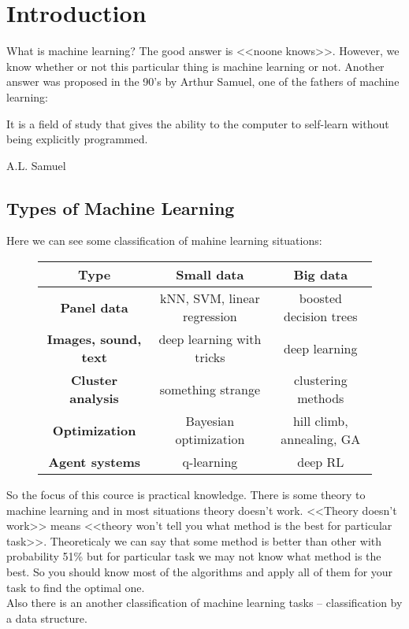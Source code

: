 \chapter{Introduction}

{\sf What is machine learning? The good answer is <<noone knows>>. However, we know whether or not this particular thing is machine learning or not. Another answer was proposed in the 90's by Arthur Samuel, one of the fathers of machine learning:
\begin{displayquote}
  \glqq It is a field of study that gives the ability to the computer to self-learn without being explicitly programmed.\grqq
  \begin{flushright}
  	A.L. Samuel
  \end{flushright}
\end{displayquote}
}

\section{Types of Machine Learning}

Here we can see some classification of mahine learning situations:
\begingroup
	\def\arraystretch{2}
	\begin{figure}[H]
		\centering
		\begin{tabular}{|c|c|c|} 
			\hline
			{\bf Type} & {\bf Small data} & {\bf Big data} \\
			\hline
			{\bf Panel data} & kNN, SVM, linear regression & boosted decision trees \\
 			\hline
 			{\bf Images, sound, text} & deep learning with tricks & deep learning \\
	 		\hline
	 		{\bf Cluster analysis} & something strange & clustering methods \\
	 		\hline
	 		{\bf Optimization} & Bayesian optimization & hill climb, annealing, GA\\
	 		\hline
	 		{\bf Agent systems} & q-learning & deep RL \\
 			\hline
		\end{tabular}
	\end{figure}
\endgroup
So the focus of this cource is practical knowledge. There is some theory to machine learning and in most situations theory doesn't work. <<Theory doesn't work>> means <<theory won't tell you what method is the best for particular task>>. Theoreticaly we can say that some method is better than other with probability 51\% but for particular task we may not know what method is the best. So you should know most of the algorithms and apply all of them for your task to find the optimal one.\\
Also there is an another classification of machine learning tasks -- classification by a data structure.

